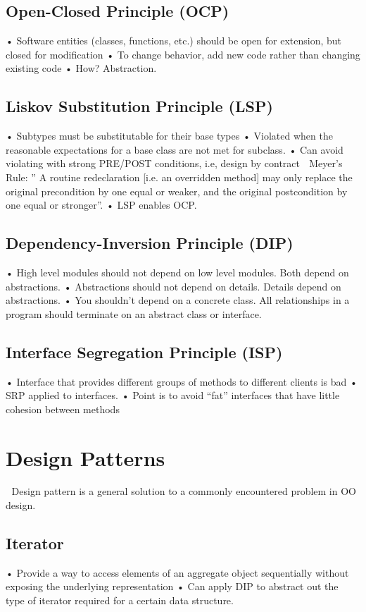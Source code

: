 \documentclass[11pt]{article}
\begin{document}
{\subsection{Open-Closed Principle (OCP)}
• Software entities (classes, functions, etc.) should be open for extension, but closed for modification
• To change behavior, add new code rather than changing existing code
• How? Abstraction.
\subsection{Liskov Substitution Principle (LSP)}
• Subtypes must be substitutable for their base types
• Violated when the reasonable expectations for a base class are not met for subclass.
• Can avoid violating with strong PRE/POST conditions, i.e, design by contract
 Meyer’s Rule:
” A routine redeclaration [i.e. an overridden method] may only replace the original precondition by
one equal or weaker, and the original postcondition by one equal or stronger”.
• LSP enables OCP.
\subsection{Dependency-Inversion Principle (DIP)}
• High level modules should not depend on low level modules. Both depend on abstractions.
• Abstractions should not depend on details. Details depend on abstractions.
• You shouldn't depend on a concrete class. All relationships in a program should terminate on an
abstract class or interface.
\subsection{Interface Segregation Principle (ISP)}
• Interface that provides different groups of methods to different clients is bad
• SRP applied to interfaces.
• Point is to avoid “fat” interfaces that have little cohesion between methods
\section{Design Patterns}
 Design pattern is a general solution to a commonly encountered problem in OO design.
\subsection{Iterator}
• Provide a way to access elements of an aggregate object sequentially without exposing the
underlying representation
• Can apply DIP to abstract out the type of iterator required for a certain data structure.
}
\end{document}
